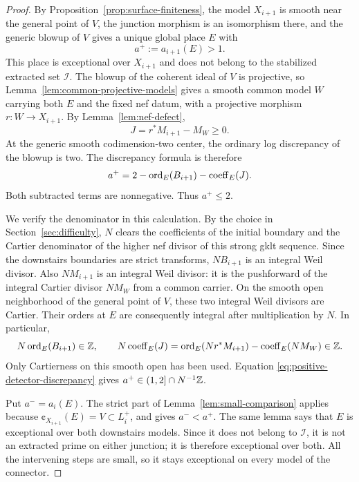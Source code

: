 \begin{proof}
By Proposition~\ref{prop:surface-finiteness}, the model \(X_{i+1}\) is
smooth near the general point of \(V\), the junction morphism is an
isomorphism there, and the generic blowup of \(V\) gives a unique global
place \(E\) with
\[
 a^+:=a_{i+1}(E)>1.
\]
This place is exceptional over \(X_{i+1}\) and does not belong to the
stabilized extracted set \(\mathcal I\).  The blowup of the coherent ideal
of \(V\) is projective, so Lemma~\ref{lem:common-projective-models} gives a
smooth common model \(W\) carrying both \(E\) and the fixed nef datum,
with a projective morphism \(r:W\to X_{i+1}\).  By Lemma~\ref{lem:nef-defect},
\[
 J=r^*M_{i+1}-M_W\geq0.
\]
At the generic smooth codimension-two center, the ordinary log discrepancy
of the blowup is two.  The discrepancy formula is therefore
\begin{equation}\label{eq:positive-detector-discrepancy}
 a^+=2-\operatorname{ord}_E(B_{i+1})-\operatorname{coeff}_E(J).
\end{equation}
Both subtracted terms are nonnegative.  Thus \(a^+\leq2\).

We verify the denominator in this calculation.  By the choice in
Section~\ref{sec:difficulty}, \(N\) clears the coefficients of the initial
boundary and the Cartier denominator of the higher nef divisor of this
strong gklt sequence.  Since the downstairs boundaries are strict
transforms, \(NB_{i+1}\) is an integral Weil divisor.  Also \(NM_{i+1}\)
is an integral Weil divisor: it is the pushforward of the integral Cartier
divisor \(NM_W\) from a common carrier.  On the smooth open neighborhood of
the general point of \(V\), these two integral Weil divisors are Cartier.
Their orders at \(E\) are consequently integral after multiplication by
\(N\).  In particular,
\[
 N\operatorname{ord}_E(B_{i+1})\in\mathbb{Z},
 \qquad
 N\operatorname{coeff}_E(J)
 =\operatorname{ord}_E(Nr^*M_{i+1})-\operatorname{coeff}_E(NM_W)\in\mathbb{Z}.
\]
Only Cartierness on this smooth open has been used.  Equation
\eqref{eq:positive-detector-discrepancy} gives
\(a^+\in(1,2]\cap N^{-1}\mathbb{Z}\).

Put \(a^-=a_i(E)\).  The strict part of
Lemma~\ref{lem:small-comparison} applies because
\(\cent_{X_{i+1}}(E)=V\subset L_i^+\), and gives \(a^-<a^+\).  The same
lemma says that \(E\) is exceptional over both downstairs models.  Since
it does not belong to \(\mathcal I\), it is not an extracted prime on either
junction; it is therefore exceptional over both.  All the intervening
steps are small, so it stays exceptional on every model of the connector.


\end{proof}
